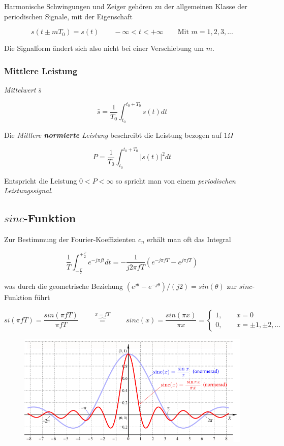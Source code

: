 \documentclass[
  10pt,
  a4paper,
  german]{article}
\numberwithin{equation}{section}
\begin{document}
Harmonische Schwingungen und Zeiger gehören zu der allgemeinen Klasse
der periodischen Signale, mit der Eigenschaft

\[
s(t\pm mT_0)=s(t)\qquad -\infty<t<+\infty\qquad\text{Mit }m=1,2,3,...
\]

Die Signalform ändert sich also nicht bei einer Verschiebung um \(m\).

\hypertarget{mittlere-leistung}{%
\subsubsection{Mittlere Leistung}\label{mittlere-leistung}}

\emph{Mittelwert} \(\bar{s}\)

\[
\bar{s}=\frac{1}{T_0}\int_{t_0}^{t_0+T_0}{s(t)dt}
\]

Die \emph{Mittlere \textbf{normierte} Leistung} beschreibt die Leistung
bezogen auf \(1\Omega\)

\[
P=\frac{1}{T_0}\int_{t_0}^{t_0+T_0}{|s(t)|^2dt}
\]

Entspricht die Leistung \(0<P<\infty\) so spricht man von einem
\emph{periodischen Leistungssignal}.

\hypertarget{sinc-funktion}{%
\subsection{\texorpdfstring{\(sinc\)-Funktion}{sinc-Funktion}}\label{sinc-funktion}}

Zur Bestimmung der Fourier-Koeffizienten \(c_n\) erhält man oft das
Integral

\[
\frac{1}{T}\int_{-\frac{T}{2}}^{+\frac{T}{2}}{e^{-j\pi ft}dt}
=-\frac{1}{j2\pi fT}(e^{-j\pi fT}-e^{j\pi fT})
\]

was durch die geometrische Beziehung
\((e^{j\theta}-e^{-j\theta})/(j2)=sin(\theta)\) zur \(sinc\)-Funktion
führt

\[
si(\pi fT)=\frac{sin(\pi fT)}{\pi fT}\qquad\overbrace{=}^{x=fT}\qquad sinc(x)=\frac{sin(\pi x)}{\pi x}=
\begin{cases}
   1,\qquad x=0\\
   0,\qquad x=\pm1,\pm2,...
\end{cases}
\]

\begin{figure}[H]

{\centering \includegraphics{images/02_sinc.png}

}

\end{figure}
\end{document}
